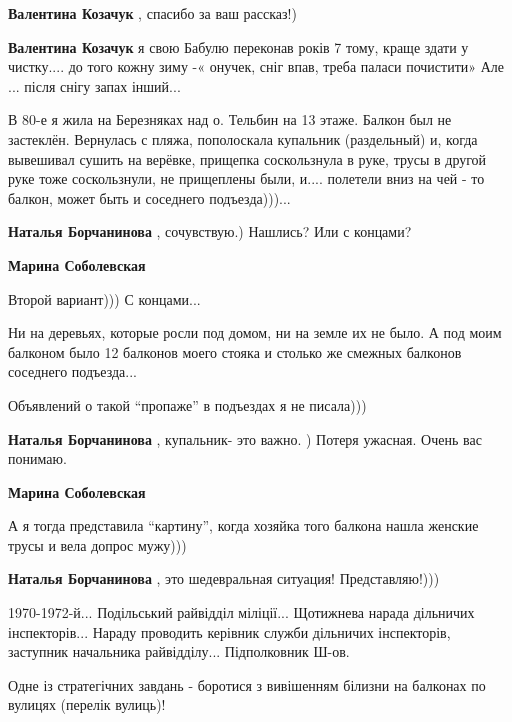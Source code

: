 \begin{itemize}
\begin{itemize} %
\textbf{Валентина Козачук} , спасибо за ваш рассказ!)

\textbf{Валентина Козачук} я свою Бабулю переконав років 7 тому, краще здати у чистку.... до того кожну зиму -« онучек, сніг впав, треба паласи почистити»
Але ... після снігу запах інший...
\end{itemize} %


В 80-е я жила на Березняках над о. Тельбин на 13 этаже. Балкон был не
застеклён. Вернулась с пляжа, пополоскала купальник (раздельный) и, когда
вывешивал сушить на верёвке, прищепка соскользнула в руке, трусы в другой руке
тоже соскользнули, не прищеплены были, и.... полетели вниз на чей - то балкон,
может быть и соседнего подъезда)))...

\begin{itemize} %
\textbf{Наталья Борчанинова} , сочувствую.) Нашлись? Или с концами?

\textbf{Марина Соболевская} 

Второй вариант))) С концами...

Ни на деревьях, которые росли под домом, ни на земле их не было. А под моим
балконом было 12 балконов моего стояка и столько же смежных балконов соседнего
подъезда...

Объявлений о такой \enquote{пропаже} в подъездах я не писала)))

\textbf{Наталья Борчанинова} , купальник- это важно. ) Потеря ужасная. Очень вас понимаю.

\textbf{Марина Соболевская} 

А я тогда представила \enquote{картину}, когда хозяйка того балкона нашла
женские трусы и вела допрос мужу)))

\textbf{Наталья Борчанинова} , это шедевральная ситуация! Представляю!)))
\end{itemize} %


1970-1972-й... Подільський райвідділ міліції... Щотижнева нарада дільничих
інспекторів... Нараду проводить керівник служби дільничих інспекторів,
заступник начальника райвідділу... Підполковник Ш-ов.

Одне із стратегічних завдань - боротися з вивішенням білизни на балконах по вулицях (перелік вулиць)!


\end{itemize}
